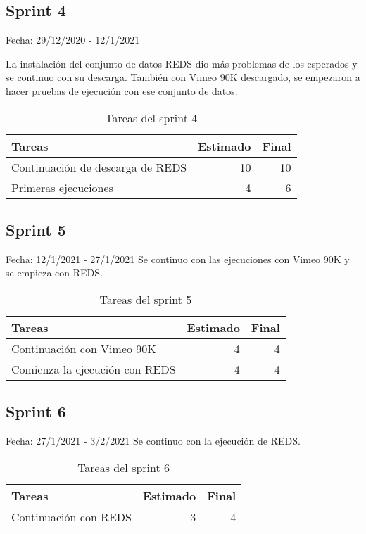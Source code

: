 \subsection{Sprint 4}

    Fecha: 29/12/2020 - 12/1/2021
    
    La instalación del conjunto de datos REDS dio más problemas de los esperados y se continuo con su descarga. También con Vimeo 90K descargado, se empezaron a hacer pruebas de ejecución con ese conjunto de datos.
    
    \begin{table}[H]
    	 \begin{tabularx}{\linewidth}{X r r}
    	 	\toprule \textbf{Tareas} & \textbf{Estimado} & \textbf{Final}\\
    	 	\toprule
            Continuación de descarga de REDS & 10 & 10 \\
         	Primeras ejecuciones  & 4 & 6 \\
    	 	\bottomrule
    	 \end{tabularx}
    	 \caption{Tareas del sprint 4}
    \end{table}

\subsection{Sprint 5}

    Fecha: 12/1/2021 - 27/1/2021
    Se continuo con las ejecuciones con Vimeo 90K y se empieza con REDS.
    
    \begin{table}[H]
    	 \begin{tabularx}{\linewidth}{X r r}
    	 	\toprule \textbf{Tareas} & \textbf{Estimado} & \textbf{Final}\\
    	 	\toprule
         	Continuación con Vimeo 90K  & 4 & 4 \\
         	Comienza la ejecución con REDS  & 4 & 4 \\
    	 	\bottomrule
    	 \end{tabularx}
    	 \caption{Tareas del sprint 5}
    \end{table}

\subsection{Sprint 6}
    Fecha: 27/1/2021 - 3/2/2021
    Se continuo con la ejecución de REDS.
    \begin{table}[H]
    	 \begin{tabularx}{\linewidth}{X r r}
    	 	\toprule \textbf{Tareas} & \textbf{Estimado} & \textbf{Final}\\
    	 	\toprule
         	Continuación con REDS  & 3 & 4 \\
    	 	\bottomrule
    	 \end{tabularx}
    	 \caption{Tareas del sprint 6}
    \end{table}

